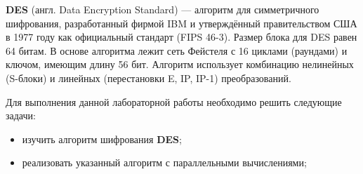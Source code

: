 \Introduction
\textbf{DES} (англ. Data Encryption Standard) — алгоритм для симметричного шифрования, разработанный фирмой IBM и утверждённый правительством США в 1977 году как официальный стандарт (FIPS 46-3). Размер блока для DES равен 64 битам. В основе алгоритма лежит сеть Фейстеля с 16 циклами (раундами) и ключом, имеющим длину 56 бит. Алгоритм использует комбинацию нелинейных (S-блоки) и линейных (перестановки E, IP, IP-1) преобразований.

Для выполнения данной лабораторной работы необходимо решить следующие задачи:

\begin{itemize}
    \item изучить алгоритм шифрования \textbf{DES};
    \item реализовать указанный алгоритм с параллельными вычислениями;
\end{itemize}
